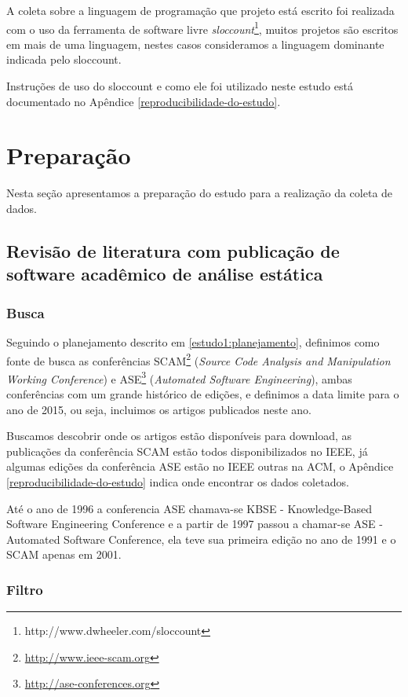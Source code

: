 A coleta sobre a linguagem de programação que projeto está escrito foi
realizada com o uso da ferramenta de software livre {\it
sloccount}\footnote{http://www.dwheeler.com/sloccount}, muitos projetos são
escritos em mais de uma linguagem, nestes casos consideramos a linguagem
dominante indicada pelo sloccount.

Instruções de uso do sloccount e como ele foi utilizado neste estudo está
documentado no Apêndice \ref{reproducibilidade-do-estudo}.


\section{Preparação} \label{estudo1:preparacao}

Nesta seção apresentamos a preparação do estudo para a realização da coleta de
dados.

\subsection{Revisão de literatura com publicação de software acadêmico de análise estática} %

\subsubsection{Busca}

Seguindo o planejamento descrito em \ref{estudo1:planejamento}, definimos como
fonte de busca as conferências SCAM\footnote{\url{http://www.ieee-scam.org}}
({\it Source Code Analysis and Manipulation Working Conference}) e
ASE\footnote{\url{http://ase-conferences.org}} ({\it Automated Software
Engineering}), ambas conferências com um grande histórico de edições, e
definimos a data limite para o ano de 2015, ou seja, incluimos os artigos
publicados neste ano.

Buscamos descobrir onde os artigos estão disponíveis para download, as
publicações da conferência SCAM estão todos disponibilizados no IEEE, já
algumas edições da conferência ASE estão no IEEE outras na ACM, o Apêndice
\ref{reproducibilidade-do-estudo} indica onde encontrar os dados coletados.

Até o ano de 1996 a conferencia ASE chamava-se KBSE - Knowledge-Based Software
Engineering Conference e a partir de 1997 passou a chamar-se ASE - Automated
Software Conference, ela teve sua primeira edição no ano de 1991 e o SCAM
apenas em 2001.

\subsubsection{Filtro}

